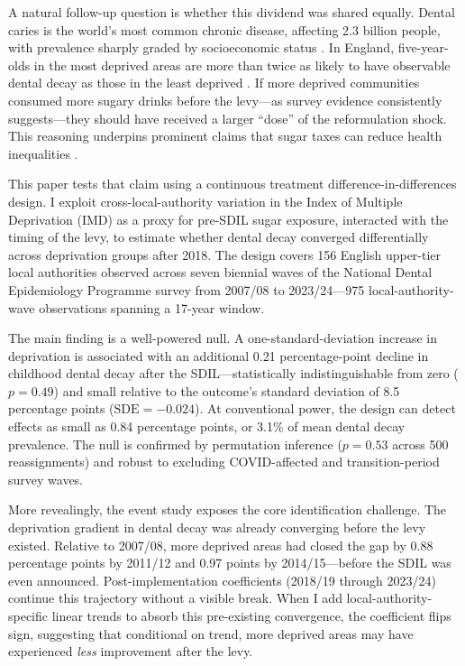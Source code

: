 \documentclass[12pt]{article}
\begin{document}
A natural follow-up question is whether this dividend was shared equally. Dental caries is the world's most common chronic disease, affecting 2.3 billion people, with prevalence sharply graded by socioeconomic status \citep{vos2020lancet, bernabe2020global}. In England, five-year-olds in the most deprived areas are more than twice as likely to have observable dental decay as those in the least deprived \citep{marmot2010review}. If more deprived communities consumed more sugary drinks before the levy---as survey evidence consistently suggests---they should have received a larger ``dose'' of the reformulation shock. This reasoning underpins prominent claims that sugar taxes can reduce health inequalities \citep{briggs2017sdil, tsakos2015sugar}.

This paper tests that claim using a continuous treatment difference-in-differences design. I exploit cross-local-authority variation in the Index of Multiple Deprivation (IMD) as a proxy for pre-SDIL sugar exposure, interacted with the timing of the levy, to estimate whether dental decay converged differentially across deprivation groups after 2018. The design covers 156 English upper-tier local authorities observed across seven biennial waves of the National Dental Epidemiology Programme survey from 2007/08 to 2023/24---975 local-authority-wave observations spanning a 17-year window.

The main finding is a well-powered null. A one-standard-deviation increase in deprivation is associated with an additional 0.21 percentage-point decline in childhood dental decay after the SDIL---statistically indistinguishable from zero ($p = 0.49$) and small relative to the outcome's standard deviation of 8.5 percentage points ($\text{SDE} = -0.024$). At conventional power, the design can detect effects as small as 0.84 percentage points, or 3.1\% of mean dental decay prevalence. The null is confirmed by permutation inference ($p = 0.53$ across 500 reassignments) and robust to excluding COVID-affected and transition-period survey waves.

More revealingly, the event study exposes the core identification challenge. The deprivation gradient in dental decay was already converging before the levy existed. Relative to 2007/08, more deprived areas had closed the gap by 0.88 percentage points by 2011/12 and 0.97 points by 2014/15---before the SDIL was even announced. Post-implementation coefficients (2018/19 through 2023/24) continue this trajectory without a visible break. When I add local-authority-specific linear trends to absorb this pre-existing convergence, the coefficient flips sign, suggesting that conditional on trend, more deprived areas may have experienced \textit{less} improvement after the levy.
\end{document}
